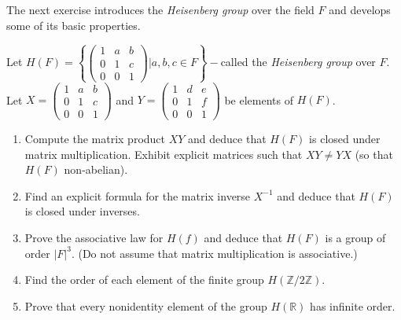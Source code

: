 \documentclass[12pt]{article}
\newcommand{\Z}{\mathbb{Z}}
\newcommand{\R}{\mathbb{R}}
\newenvironment{problem}[2][Problem]{\begin{trivlist} \item[\hskip \labelsep {\bfseries #1}\hskip \labelsep {\bfseries #2.}]}{\end{trivlist}}
\begin{document}
The next exercise introduces the \textit{Heisenberg group} over the field $F$ and develops some of its basic properties.
\begin{problem}{11}
  Let $H(F)=\left\{ \begin{pmatrix}1 & a & b\\ 0 & 1 & c\\ 0 & 0 & 1\end{pmatrix} | a,b,c\in F\right\}-$called the \textit{Heisenberg group} over $F$. Let $X=\begin{pmatrix}1 & a & b\\ 0 & 1 & c\\ 0 & 0 & 1\end{pmatrix}$ and $Y=\begin{pmatrix}1 & d & e \\ 0 & 1 & f\\ 0 & 0 & 1\end{pmatrix}$ be elements of $H(F)$.
\begin{enumerate}
  \item Compute the matrix product $XY$ and deduce that $H(F)$ is closed under matrix multiplication. Exhibit explicit matrices such that $XY\neq YX$ (so that $H(F)$ non-abelian).
  \item Find an explicit formula for the matrix inverse $X^{-1}$ and deduce that $H(F)$ is closed under inverses.
  \item Prove the associative law for $H(f)$ and deduce that $H(F)$ is a group of order $|F|^{3}$. (Do not assume that matrix multiplication is associative.)
  \item Find the order of each element of the finite group $H(\Z/2\Z)$.
  \item Prove that every nonidentity element of the group $H(\R)$ has infinite order.
\end{enumerate}
\end{problem}
       
\end{document}
